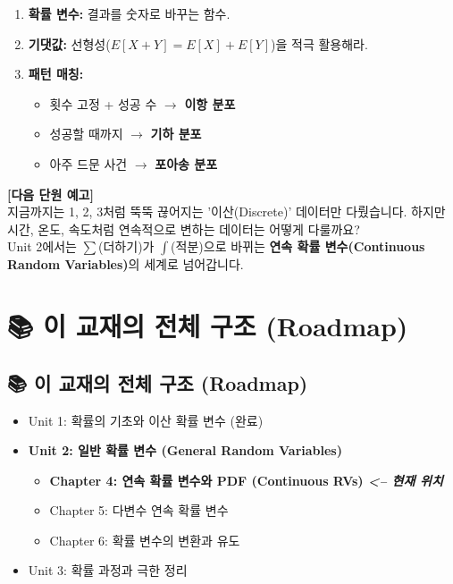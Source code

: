 \documentclass[11pt,a4paper]{book}
\theoremstyle{definition}
\begin{document}
\begin{tcolorbox}[colback=mainblue!10, colframe=mainblue, title={\textbf{📝 Unit 1-3 핵심 요약}}]
\begin{enumerate}
    \item \textbf{확률 변수:} 결과를 숫자로 바꾸는 함수.
    \item \textbf{기댓값:} 선형성($E[X+Y]=E[X]+E[Y]$)을 적극 활용해라.
    \item \textbf{패턴 매칭:} 
    \begin{itemize}
        \item 횟수 고정 + 성공 수 $\to$ \textbf{이항 분포}
        \item 성공할 때까지 $\to$ \textbf{기하 분포}
        \item 아주 드문 사건 $\to$ \textbf{포아송 분포}
    \end{itemize}
\end{enumerate}
\end{tcolorbox}

\vspace{0.5cm}
\textbf{[다음 단원 예고]} \\
지금까지는 1, 2, 3처럼 뚝뚝 끊어지는 '이산(Discrete)' 데이터만 다뤘습니다. 하지만 시간, 온도, 속도처럼 연속적으로 변하는 데이터는 어떻게 다룰까요? \\
Unit 2에서는 $\sum$(더하기)가 $\int$(적분)으로 바뀌는 \textbf{연속 확률 변수(Continuous Random Variables)}의 세계로 넘어갑니다.


\chapter{📚 이 교재의 전체 구조 (Roadmap)}
\label{ch:lecture4}



\section*{📚 이 교재의 전체 구조 (Roadmap)}
\begin{itemize}
    \item Unit 1: 확률의 기초와 이산 확률 변수 (완료)
    \item \textbf{Unit 2: 일반 확률 변수 (General Random Variables)}
    \begin{itemize}
        \item[$\to$] \textbf{\textcolor{mainblue}{Chapter 4: 연속 확률 변수와 PDF (Continuous RVs) \textit{<-- 현재 위치}}}
        \item Chapter 5: 다변수 연속 확률 변수
        \item Chapter 6: 확률 변수의 변환과 유도
    \end{itemize}
    \item Unit 3: 확률 과정과 극한 정리
\end{itemize}
\vspace{1cm}
\end{document}
